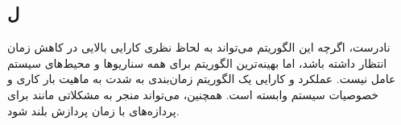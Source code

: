\subsection*{ل}
نادرست، اگرچه این الگوریتم می‌تواند به لحاظ نظری کارایی بالایی در کاهش زمان انتظار داشته باشد، اما بهینه‌ترین الگوریتم برای همه سناریوها و محیط‌های سیستم عامل نیست. عملکرد و کارایی یک الگوریتم زمان‌بندی به شدت به ماهیت بار کاری و خصوصیات سیستم وابسته است. همچنین،  می‌تواند منجر به مشکلاتی مانند
برای پردازه‌های با زمان پردازش بلند شود.